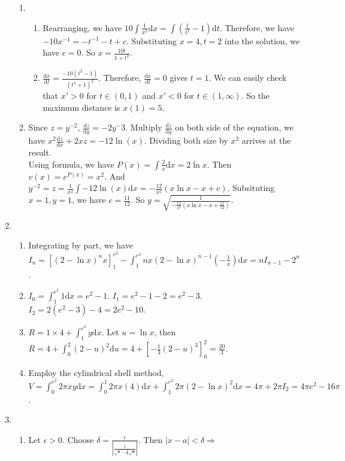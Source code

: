 \documentclass[12pt]{article}
\newcommand{\diff}{\mathrm{d}}
\theoremstyle{definition}
\begin{document}
\begin{enumerate}
\begin{enumerate}
    \item\begin{enumerate}
      \item Rearranging, we have $10\int\frac{1}{x^2}\diff x = \int (\frac{1}{t^2}-1)\diff t$. Therefore, we have $-10x^{-1}=-t^{-1}-t+c$. Substituting $x=4, t=2$ into the solution, we have $c=0$. So $x=\frac{10t}{1+t^2}$.
      \item $\frac{\diff x}{\diff t}=\frac{-10(t^2-1)}{(t^2+1)^2}$. Therefore, $\frac{\diff x}{\diff t}=0$ gives $t=1$. We can easily check that $x'>0$ for $t\in(0,1)$ and $x'<0$ for $t\in(1,\infty)$. So the maximum distance is $x(1)=5$.
    \end{enumerate}
    \item Since $z=y^{-2}$, $\frac{\diff z}{\diff y}=-2y^-3$. Multiply $\frac{\diff z}{\diff y}$ on both side of the equation, we have $x^2\frac{\diff z}{\diff x}+2xz = -12\ln(x)$. Dividing both size by $x^2$ arrives at the result.\\
    Using formula, we have $P(x)=\int \frac{2}{x}\diff x = 2\ln x$. Then $v(x)=e^{P(x)}=x^2$. And $y^{-2}=z=\frac{1}{x^2}\int -12\ln(x)\diff x=-\frac{12}{x^2}(x\ln x - x + c)$. Subsituting $x=1, y=1$, we have $c=\frac{11}{12}$. So $y=\sqrt{\frac{1}{-\frac{12}{x^2}(x\ln x - x + \frac{11}{12})}}$.
  \end{enumerate}
  \item\begin{enumerate}
    \item Integrating by part, we have $I_n = [(2-\ln x)^nx]_1^{e^2}-\int_1^{e^2} nx(2-\ln x)^{n-1}(-\frac{1}{x})\diff x = nI_{n-1}-2^n$.
    \item $I_0 = \int_1^{e^2} 1\diff x = e^2-1$. $I_1 = e^2-1-2 = e^2-3$. $I_2 = 2(e^2-3)-4 = 2e^2-10$.
    \item $R=1\times 4 + \int_1^{e^2}y\diff x$. Let $u=\ln x$, then $R=4+\int_0^2 (2-u)^2\diff u =4+[-\frac{1}{3}(2-u)^3]_0^2 = \frac{20}{3}$. 
    \item Employ the cylindrical shell method, $V=\int_0^{e^2}2\pi xy\diff x = \int_0^1 2\pi x(4)\diff x + \int_1^{e^2} 2\pi (2-\ln x)^2\diff x = 4\pi + 2\pi I_2 = 4\pi e^2-16\pi$.
  \end{enumerate}
  \item\begin{enumerate}
    \item Let $\epsilon>0$. Choose $\delta = \frac{\epsilon}{|\frac{1}{\sqrt{a}-\frac{1}{8}\sqrt{a}}|}$. Then $|x-a|<\delta \Rightarrow$
    \begin{align*}

\end{align*}
\end{enumerate}
\end{enumerate}
\end{document}
